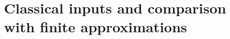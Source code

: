 \section{Classical inputs and comparison with finite approximations}
\label{app:comparison}\label{sec:literature-comparison}






